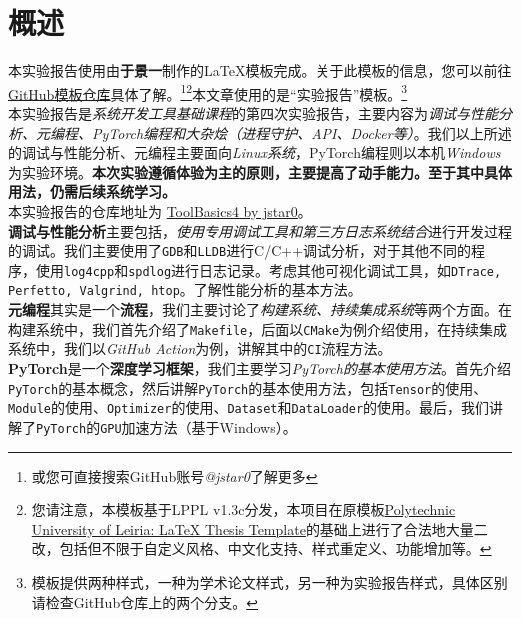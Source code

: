 \thispagestyle{plain} %
\chapter*{概述} %
\label{cp:abstract}

本实验报告使用由\textbf{于景一}制作的\LaTeX{}模板完成。关于此模板的信息，您可以前往\href{https://github.com/jstar0/LaTeXTemplate/}{GitHub模板仓库}具体了解。\footnote{或您可直接搜索GitHub账号\textit{@jstar0}了解更多}\footnote{您请注意，本模板基于LPPL v1.3c分发，本项目在原模板\href{https://github.com/joseareia/ipleiria-thesis}{Polytechnic University of Leiria: LaTeX Thesis Template}的基础上进行了合法地大量二改，包括但不限于自定义风格、中文化支持、样式重定义、功能增加等。}本文章使用的是“实验报告”模板。\footnote{模板提供两种样式，一种为学术论文样式，另一种为实验报告样式，具体区别请检查GitHub仓库上的两个分支。}\\

本实验报告是\textit{系统开发工具基础课程}的第四次实验报告，主要内容为\textit{调试与性能分析、元编程、PyTorch编程和大杂烩（进程守护、API、Docker等）}。我们以上所述的调试与性能分析、元编程主要面向\textit{Linux系统}，PyTorch编程则以本机\textit{Windows}为实验环境。\textbf{本次实验遵循体验为主的原则，主要提高了动手能力。至于其中具体用法，仍需后续系统学习。}\\

本实验报告的仓库地址为 \href{https://github.com/jstar0/ToolBasics4}{ToolBasics4 by jstar0}。\\

\textbf{调试与性能分析}主要包括，\textit{使用专用调试工具和第三方日志系统结合}进行开发过程的调试。我们主要使用了\texttt{GDB}和\texttt{LLDB}进行C/C++调试分析，对于其他不同的程序，使用\texttt{log4cpp}和\texttt{spdlog}进行日志记录。考虑其他可视化调试工具，如\texttt{DTrace, Perfetto, Valgrind, htop}。了解性能分析的基本方法。\\

\textbf{元编程}其实是一个\textbf{流程}，我们主要讨论了\textit{构建系统、持续集成系统}等两个方面。在构建系统中，我们首先介绍了\texttt{Makefile}，后面以\texttt{CMake}为例介绍使用，在持续集成系统中，我们以\textit{GitHub Action}为例，讲解其中的\texttt{CI}流程方法。\\

\textbf{PyTorch}是一个\textbf{深度学习框架}，我们主要学习\textit{PyTorch的基本使用方法}。首先介绍\texttt{PyTorch}的基本概念，然后讲解\texttt{PyTorch}的基本使用方法，包括\texttt{Tensor}的使用、\texttt{Module}的使用、\texttt{Optimizer}的使用、\texttt{Dataset}和\texttt{DataLoader}的使用。最后，我们讲解了\texttt{PyTorch}的\texttt{GPU}加速方法（基于Windows）。\\

